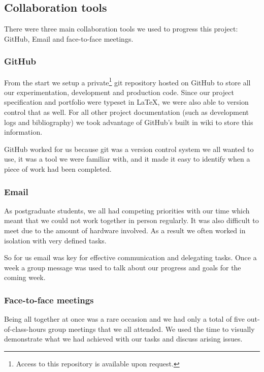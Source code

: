 \documentclass[11pt,a4paper,titlepage]{report}
\begin{document}
\subsection{Collaboration tools}

There were three main collaboration tools we used to progress this project: GitHub, Email and face-to-face meetings.

\subsubsection{GitHub}

From the start we setup a private\footnote{Access to this repository is available upon request.} git repository hosted on GitHub to store all our experimentation, development and production code. Since our project specification and portfolio were typeset in \LaTeX, we were also able to version control that as well. For all other project documentation (such as development logs and bibliography) we took advantage of GitHub's built in wiki to store this information.

GitHub worked for us because git was a version control system we all wanted to use, it was a tool we were familiar with, and it made it easy to identify when a piece of work had been completed.

\subsubsection{Email}

As postgraduate students, we all had competing priorities with our time which meant that we could not work together in person regularly. It was also difficult to meet due to the amount of hardware involved. As a result we often worked in isolation with very defined tasks.

So for us email was key for effective communication and delegating tasks. Once a week a group message was used to talk about our progress and goals for the coming week.

\subsubsection{Face-to-face meetings}

Being all together at once was a rare occasion and we had only a total of five out-of-class-hours group meetings that we all attended. We used the time to visually demonstrate what we had achieved with our tasks and discuss arising issues. 
\end{document}
